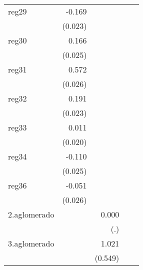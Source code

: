 {\begin{longtable}{l*{4}{D{.}{.}{-1}}}
\addlinespace
reg29       &      -0.169\sym{***}&                     &                     &                     \\
            &     (0.023)         &                     &                     &                     \\
\addlinespace
reg30       &       0.166\sym{***}&                     &                     &                     \\
            &     (0.025)         &                     &                     &                     \\
\addlinespace
reg31       &       0.572\sym{***}&                     &                     &                     \\
            &     (0.026)         &                     &                     &                     \\
\addlinespace
reg32       &       0.191\sym{***}&                     &                     &                     \\
            &     (0.023)         &                     &                     &                     \\
\addlinespace
reg33       &       0.011         &                     &                     &                     \\
            &     (0.020)         &                     &                     &                     \\
\addlinespace
reg34       &      -0.110\sym{***}&                     &                     &                     \\
            &     (0.025)         &                     &                     &                     \\
\addlinespace
reg36       &      -0.051\sym{*}  &                     &                     &                     \\
            &     (0.026)         &                     &                     &                     \\
\addlinespace
2.aglomerado&                     &       0.000         &                     &                     \\
            &                     &         (.)         &                     &                     \\
\addlinespace
3.aglomerado&                     &       1.021         &                     &                     \\
            &                     &     (0.549)         &                     &                     \\

\end{longtable}}
